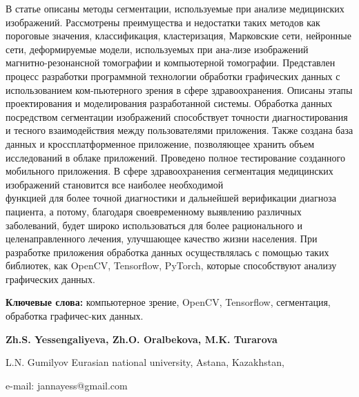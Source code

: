 В статье описаны методы сегментации, используемые при анализе
медицинских изображений. Рассмотрены преимущества и недостатки таких
методов как пороговые значения, классификация, кластеризация, Марковские
сети, нейронные сети, деформируемые модели, используемых при ана-лизе
изображений магнитно-резонансной томографии и компьютерной томографии.
Представлен процесс разработки программной технологии обработки
графических данных с использованием ком-пьютерного зрения в сфере
здравоохранения. Описаны этапы проектирования и моделирования
разработанной системы. Обработка данных посредством сегментации
изображений способствует точности диагностирования и тесного
взаимодействия между пользователями приложения. Также создана база
данных и кроссплатформенное приложение, позволяющее хранить объем
исследований в облаке приложений. Проведено полное тестирование
созданного мобильного приложения. В сфере здравоохранения сегментация
медицинских изображений становится все наиболее необходимой \\функцией для
более точной диагностики и дальнейшей верификации диагноза пациента, а
потому, благодаря своевременному выявлению различных заболеваний, будет
широко использоваться для более рационального и целенаправленного
лечения, улучшающее качество жизни населения. При разработке приложения
обработка данных осуществлялась с помощью таких библиотек, как OpenCV,
Tensorflow, PyTorch, которые способствуют анализу графических данных.

{\bfseries Ключевые слова:} компьютерное зрение, OpenCV, Tensorflow,
сегментация, обработка графичес-ких данных.


\begin{center}
{\bfseries Zh.S. Yessengaliyeva\envelope, Zh.O. Oralbekova, M.K.
Turarova}

L.N. Gumilyov Eurasian national university, Astana, Kazakhstan,

e-mail: jannayess@gmail.com
\end{center}

